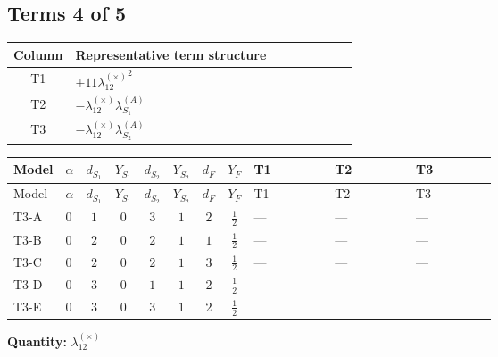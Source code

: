 \documentclass[8pt]{article}
\begin{document}
\begin{landscape}
\subsection*{Terms 4 of 5}
\begin{center}
\begin{tabular}{@{}c >{\raggedright\arraybackslash}p{0.82\linewidth}@{}}
\toprule
Column & Representative term structure \\
\midrule
T1 & \(\displaystyle +11 {\lambda_{12}^{(\times)}}^2\) \\
\midrule
T2 & \(\displaystyle -{\lambda_{12}^{(\times)}} {\lambda_{S_1}^{(A)}}\) \\
\midrule
T3 & \(\displaystyle -{\lambda_{12}^{(\times)}} {\lambda_{S_2}^{(A)}}\) \\
\midrule
\bottomrule
\end{tabular}
\end{center}
\smallskip
\tiny
\begin{longtable}{@{}llcccccc >{\raggedright\arraybackslash}p{0.21\linewidth} >{\raggedright\arraybackslash}p{0.21\linewidth} >{\raggedright\arraybackslash}p{0.21\linewidth}@{}}
\toprule
Model & $\alpha$ & $d_{S_1}$ & $Y_{S_1}$ & $d_{S_2}$ & $Y_{S_2}$ & $d_F$ & $Y_F$ & T1 & T2 & T3 \\
\midrule
\endfirsthead
\toprule
Model & $\alpha$ & $d_{S_1}$ & $Y_{S_1}$ & $d_{S_2}$ & $Y_{S_2}$ & $d_F$ & $Y_F$ & T1 & T2 & T3 \\
\midrule
\endhead
T3-A & $0$ & $1$ & $0$ & $3$ & $1$ & $2$ & $\frac{1}{2}$ & --- & --- & --- \\
\midrule
T3-B & $0$ & $2$ & $0$ & $2$ & $1$ & $1$ & $\frac{1}{2}$ & --- & --- & --- \\
\midrule
T3-C & $0$ & $2$ & $0$ & $2$ & $1$ & $3$ & $\frac{1}{2}$ & --- & --- & --- \\
\midrule
T3-D & $0$ & $3$ & $0$ & $1$ & $1$ & $2$ & $\frac{1}{2}$ & --- & --- & --- \\
\midrule
T3-E & $0$ & $3$ & $0$ & $3$ & $1$ & $2$ & $\frac{1}{2}$ & \scriptsize\adjustbox{max width=\linewidth}{$\begin{gathered} +11 {\lambda_{12}^{(\times)}}^2\end{gathered}$} & \scriptsize\adjustbox{max width=\linewidth}{$\begin{gathered} -{\lambda_{12}^{(\times)}} {\lambda_{S_1}^{(A)}}\end{gathered}$} & \scriptsize\adjustbox{max width=\linewidth}{$\begin{gathered} -{\lambda_{12}^{(\times)}} {\lambda_{S_2}^{(A)}}\end{gathered}$} \\
\midrule
\bottomrule
\end{longtable}
\clearpage
\noindent\textbf{Quantity: }$\lambda_{12}^{(\times)}$\par\smallskip

\end{landscape}
\end{document}
